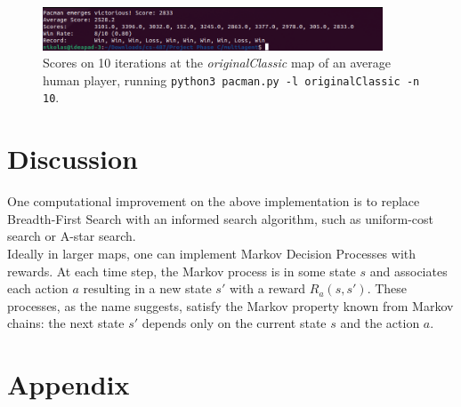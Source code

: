 \documentclass{article}
\def\code#1{\texttt{#1}}
\begin{document}
\begin{figure}[h]
	\centering
	\includegraphics[width=0.9\textwidth]{images/scores_human.png}
	\caption{Scores on 10 iterations at the \textit{originalClassic} map of an average human player, running \code{python3 pacman.py -l originalClassic -n 10}.}
\end{figure}

\newpage

\section{Discussion}

One computational improvement on the above implementation is to replace Breadth-First Search with an informed search algorithm, such as uniform-cost search or A-star search. \\

Ideally in larger maps, one can implement Markov Decision Processes with rewards. At each time step, the Markov process is in some state $s$ and associates each action $a$ resulting in a new state $s'$ with a reward $R_a(s,s')$. These processes, as the name suggests, satisfy the Markov property known from Markov chains: the next state $s'$ depends only on the current state $s$ and the action $a$.   

\newpage

\section{Appendix}

\appendix
\end{document}

